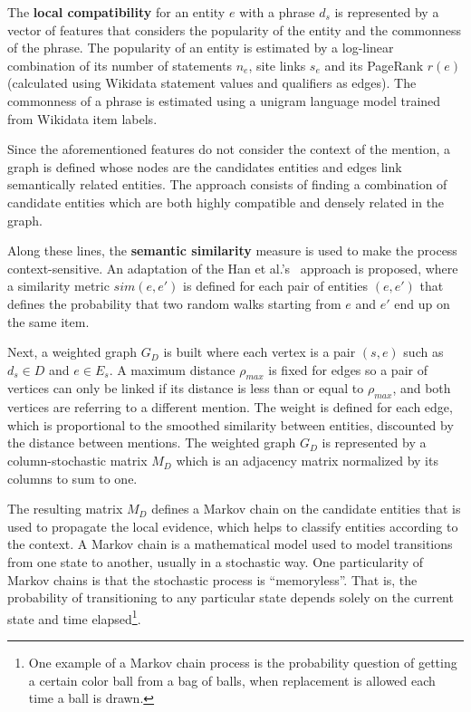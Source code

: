 The \textbf{local compatibility} for an entity $e$ with a phrase $d_s$ is represented by a 
vector of features that considers the popularity of the entity and the commonness of the 
phrase. The popularity of an entity is estimated by a log-linear combination of its number of 
statements $n_e$, site links $s_e$ and its PageRank $r(e)$ (calculated using Wikidata 
statement values and qualifiers as edges). The commonness of a phrase is estimated using a 
unigram language model trained from Wikidata item labels.

Since the aforementioned features do not consider the context of the mention, a graph is defined 
whose nodes are the candidates entities and edges link semantically related entities. The 
approach consists of finding a combination of candidate entities which are both highly 
compatible and densely related in the graph.

Along these lines, the \textbf{semantic similarity} measure is used to make the process 
context-sensitive. An adaptation of the Han et al.'s~\cite{infExtr:HanSZ11} approach is 
proposed, where a similarity metric $sim(e,e')$ is defined for each pair of entities $(e,e')$ 
that defines the probability that two random walks starting from $e$ and $e'$ end up on the 
same item.

Next, a weighted graph $G_D$ is built where each vertex is a pair $(s,e)$ such as $d_s \in D$ 
and $e \in E_s$. A maximum distance $\rho_{max}$ is fixed for edges so a pair of vertices can 
only be linked if its distance is less than or equal to $\rho_{max}$, and both vertices are 
referring to a different mention. The weight is defined for each edge, which is proportional to
the smoothed similarity between entities, discounted by the distance between mentions. The 
weighted graph $G_D$ is represented by a column-stochastic matrix $M_D$ which is an adjacency 
matrix normalized by its columns to sum to one.

The resulting matrix $M_D$ defines a Markov chain on the candidate entities that is used to
propagate the local evidence, which helps to classify entities according to the context. A 
Markov chain is a mathematical model used to model transitions from one state to another, 
usually in a stochastic way. One particularity of Markov chains is that the stochastic 
process is “memoryless”. That is, the probability of transitioning to any particular state 
depends solely on the current state and time elapsed\footnote{One example of a Markov chain 
process is the probability question of getting a certain color ball from a bag of balls, when 
replacement is allowed each time a ball is drawn.}.


